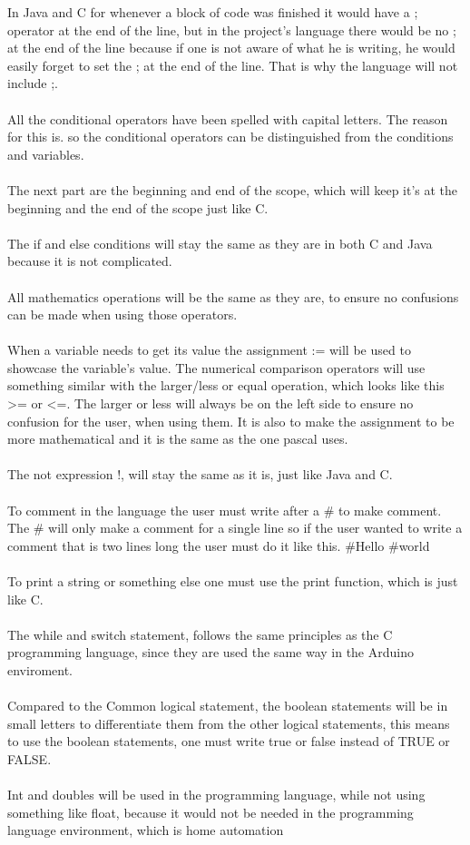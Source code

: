  
In Java and C for whenever a block of code was finished it would have a ; operator at the end of the line, but in the project's language there would be no ; at the end of the line because if one is not aware of what he is writing, he would easily forget to set the ; at the end of the line. That is why the language will not include ;. \\
 \\
All the conditional operators have been spelled with capital letters. The reason for this is. so the conditional operators can be distinguished from the conditions and variables. \\
 \\
The next part are the beginning and end of the scope, which will keep it's {} at the beginning and the end of the scope just like C.  \\
 \\
The if and else conditions will stay the same as they are in both C and Java because it is not complicated. \\
 \\
All mathematics operations will be the same as they are, to ensure no confusions can be made when using those operators. \\
 \\
When a variable needs to get its value the assignment := will be used to showcase the variable's value. The numerical comparison operators will use something similar with the  larger/less or equal operation, which looks like this >= or <=. The larger or less will always be on the left side to ensure no confusion for the user, when using them. It is also to make the assignment to be more mathematical and it is the same as the one pascal uses.  \\
 \\
The not expression !, will stay the same as it is, just like Java and C. \\
 \\
To comment in the language the user must write after a \# to make comment. The \# will only make a comment for a single line so if the user wanted to write a comment that is two lines long the user must do it like this.
\#Hello
\#world \\
 \\
To print a string or something else one must use the print function, which is just like C.\\
 \\
The while and switch statement, follows the same principles as the C programming language, since they are used the same way in the Arduino enviroment.\\
 \\
Compared to the Common logical statement, the boolean statements will be in small letters to differentiate them from the other logical statements, this means to use the boolean statements, one must write true or false instead of TRUE or FALSE.\\
 \\
 Int and doubles will be used in the programming language, while not using something like float, because it would not be needed in the programming language environment, which is home automation